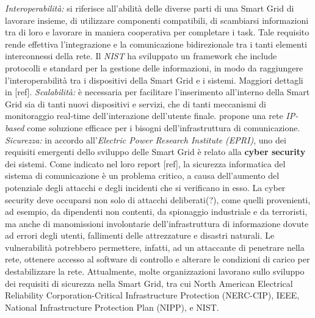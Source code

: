 \newline \newline
\textit{Interoperabilità:} si riferisce all'abilità delle diverse parti di una Smart Grid di lavorare insieme, di utilizzare componenti compatibili, di scambiarsi informazioni tra di loro e lavorare in maniera cooperativa per completare i task. Tale requisito rende effettiva l'integrazione e la comunicazione bidirezionale tra i tanti elementi interconnessi della rete.\newline
Il \emph{NIST} ha sviluppato un framework che include protocolli e standard per la gestione delle informazioni, in modo da raggiungere l'interoperabilità tra i dispositivi della Smart Grid e i sistemi. Maggiori dettagli in [ref].
\newline \newline
\textit{Scalabilità:} è necessaria per facilitare l'inserimento all'interno della Smart Grid sia di tanti nuovi dispositivi e servizi, che di tanti meccanismi di monitoraggio real-time dell'interazione dell'utente finale. \newline
[ref] propone una rete \emph{IP-based} come soluzione efficace per i bisogni dell'infrastruttura di comunicazione.
\newline \newline
\textit{Sicurezza:} in accordo all'\emph{Electric Power Research Institute (EPRI)}, uno dei requisiti emergenti dello sviluppo delle Smart Grid è relato alla \textbf{cyber security} dei sistemi. Come indicato nel loro report [ref], la sicurezza informatica del sistema di comunicazione è un problema critico, a causa dell'aumento del potenziale degli attacchi e degli incidenti che si verificano in esso. \newline 
La cyber security deve occuparsi non solo di attacchi deliberati(?), come quelli provenienti, ad esempio, da dipendenti non contenti, da spionaggio industriale e da terroristi, ma anche di manomissioni involontarie dell'infrastruttura di informazione dovute ad errori degli utenti, fallimenti delle attrezzature e disastri naturali. Le vulnerabilità potrebbero permettere, infatti, ad un attaccante di penetrare nella rete, ottenere accesso al software di controllo e alterare le condizioni di carico per destabilizzare la rete. \newline
Attualmente, molte organizzazioni lavorano sullo sviluppo dei requisiti di sicurezza nella Smart Grid, tra cui North American Electrical Reliability Corporation-Critical Infrastructure Protection (NERC-CIP), IEEE, National Infrastructure Protection Plan (NIPP), e NIST. \newline 

